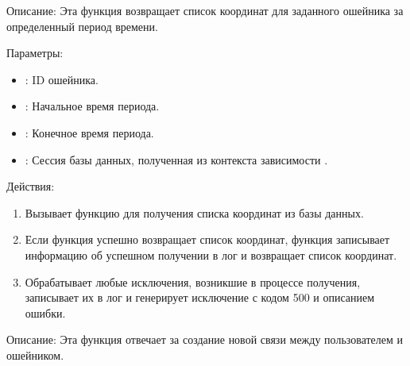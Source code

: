 \documentclass[letterpaper,10pt,russian]{sphinxmanual}
\begin{document}
\sphinxAtStartPar
{}

\sphinxAtStartPar
Описание: Эта функция возвращает список координат для заданного ошейника за определенный период времени.

\sphinxAtStartPar
Параметры:
\begin{itemize}
\item {} 
\sphinxAtStartPar
{}: ID ошейника.

\item {} 
\sphinxAtStartPar
{}: Начальное время периода.

\item {} 
\sphinxAtStartPar
{}: Конечное время периода.

\item {} 
\sphinxAtStartPar
{}: Сессия базы данных, полученная из контекста зависимости .

\end{itemize}

\sphinxAtStartPar
Действия:
\begin{enumerate}
%
\item {} 
\sphinxAtStartPar
Вызывает функцию  для получения списка координат из базы данных.

\item {} 
\sphinxAtStartPar
Если функция  успешно возвращает список координат, функция записывает информацию об успешном получении в лог и возвращает список координат.

\item {} 
\sphinxAtStartPar
Обрабатывает любые исключения, возникшие в процессе получения, записывает их в лог и генерирует исключение  с кодом 500 и описанием ошибки.

\end{enumerate}

\sphinxAtStartPar
{}

\sphinxAtStartPar
Описание: Эта функция отвечает за создание новой связи между пользователем и ошейником.
\end{document}
